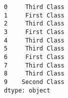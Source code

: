 \documentclass[11pt]{article}
\begin{document}
    \begin{Verbatim}[commandchars=\\\{\}]
0     Third Class
1     First Class
2     Third Class
3     First Class
4     Third Class
5     Third Class
6     First Class
7     Third Class
8     Third Class
9    Second Class
dtype: object

    \end{Verbatim}


    
    
    
    
\end{document}
